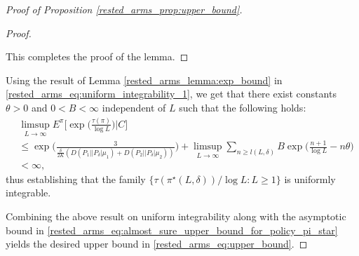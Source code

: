 \begin{proof}[Proof of Proposition \ref{rested_arms_prop:upper_bound}]
\begin{proof}
\begin{enumerate}
\end{enumerate}
This completes the proof of the lemma.
\end{proof}

Using the result of Lemma \ref{rested_arms_lemma:exp_bound} in \eqref{rested_arms_eq:uniform_integrability_1}, we get that there exist constants $\theta>0$ and $0<B<\infty$ independent of $L$ such that the following holds:
\begingroup\allowdisplaybreaks\begin{align}
&\limsup\limits_{L\to\infty}E^\pi\bigg[\exp\bigg(\frac{\tau(\pi)}{\log L}\bigg)\bigg|C\bigg]	\nonumber\\
&\leq \exp\bigg(\frac{3}{\frac{\delta}{2K}(D(P_1||P_\delta|\mu_1)+D(P_2||P_\delta|\mu_2))}\bigg)+\limsup\limits_{L\to\infty}\sum\limits_{n\geq l(L,\delta)}B\exp\bigg(\frac{n+1}{\log L}-n \theta\bigg)\nonumber\\
	&<\infty,
\end{align}\endgroup
thus establishing that the family $\{\tau(\pi^\star(L,\delta))/\log L:L\geq 1\}$ is uniformly integrable.

Combining the above result on uniform integrability along with the asymptotic bound in \eqref{rested_arms_eq:almost_sure_upper_bound_for_policy_pi_star} yields the desired upper bound in \eqref{rested_arms_eq:upper_bound}.
\end{proof}




